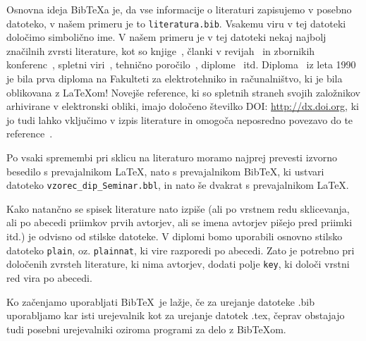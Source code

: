 \documentclass[a4paper, 12pt]{book}
\newcommand{\BibTeX}{{\sc Bib}\TeX}
\begin{document}
{{Osnovna ideja \BibTeX{a} je, da vse informacije o literaturi zapisujemo v posebno datoteko, v našem primeru je to \texttt{literatura.bib}.
Vsakemu viru v tej datoteki določimo simbolično ime.
V  našem primeru je v tej datoteki nekaj najbolj značilnih zvrsti literature, kot so knjige~\cite{lamport}, 
članki v revijah~\cite{leonardo} in zbornikih konferenc~\cite{poglavje_springer}, 
spletni viri~\cite{bib,slovarcek,video}, 
tehnično poročilo~\cite{andersen2012kinect}, 
diplome~\cite{diploma} itd.
Diploma~\cite{diploma} iz leta 1990 je bila prva diploma na Fakulteti za elektrotehniko in računalništvo, ki je bila oblikovana z \LaTeX om!
Novejše reference, ki so spletnih straneh svojih založnikov arhivirane v elektronski obliki, imajo določeno \v stevilko DOI: \url{http://dx.doi.org}, ki jo tudi lahko vključimo v izpis literature in omogoča neposredno povezavo do te reference~\cite{Kljun2018}.

Po vsaki spremembi pri sklicu na literaturo moramo najprej prevesti izvorno besedilo s prevajalnikom \LaTeX, nato s prevajalnikom  \BibTeX, ki ustvari datoteko  {\tt vzorec\_dip\_Seminar.bbl}, in nato še dvakrat s prevajalnikom  \LaTeX.

Kako natančno se spisek literature nato izpiše (ali po vrstnem redu sklicevanja, ali po abecedi priimkov prvih avtorjev, ali se imena avtorjev pišejo pred priimki itd.) je odvisno od stilske datoteke.
V diplomi bomo uporabili osnovno stilsko datoteko \texttt{plain}, oz. \texttt{plainnat}, ki vire razporedi po abecedi.
Zato je potrebno pri določenih zvrsteh literature, ki nima avtorjev, dodati polje \texttt{key}, ki določi vrstni red vira po abecedi.


Ko začenjamo uporabljati \BibTeX\ je lažje, če za urejanje datoteke .bib uporabljamo kar isti urejevalnik kot za urejanje datotek .tex, 
čeprav obstajajo tudi posebni urejevalniki oziroma programi za delo z \BibTeX om.

}}
\end{document}
